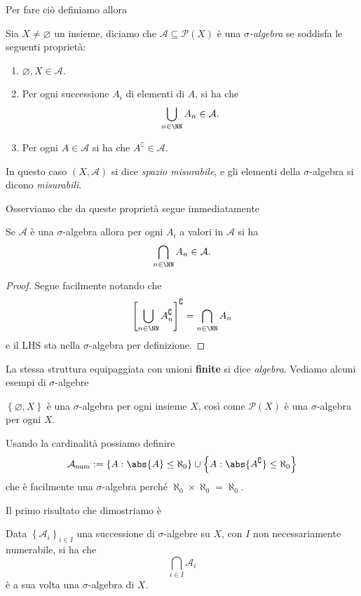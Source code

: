 \documentclass[11pt]{scrartcl}
\newcommand{\eset}{\varnothing}
\newcommand{\parti}[1]{\mathcal{P}\!\left(#1\right)}
\begin{document}
	Per fare ciò definiamo allora
	\begin{definition}
		Sia $X\ne \eset$ un insieme, diciamo che $\mathcal{A}\subseteq \parti{X}$ è una \textit{$\sigma$-algebra} se soddisfa le seguenti proprietà:
		\begin{enumerate}
			\item $\eset,X\in \mathcal{A}$.
			\item Per ogni successione $A_i$ di elementi di $A$, si ha che
			$$\bigcup_{n\in\NN}A_n\in \mathcal{A}.$$
			\item Per ogni $A\in \mathcal{A}$ si ha che $A^\complement\in \mathcal{A}$.
		\end{enumerate}
		In questo caso $(X,\mathcal{A})$ si dice \textit{spazio misurabile}, e gli elementi della $\sigma$-algebra si dicono \textit{misurabili}.
	\end{definition}
	Osserviamo che da queste proprietà segue immediatamente
	\begin{proposition}
		Se $\mathcal{A}$ è una $\sigma$-algebra allora per ogni $A_i$ a valori in $\mathcal{A}$ si ha
		$$\bigcap_{n\in\NN}A_n\in \mathcal{A}.$$
	\end{proposition}
	\begin{proof}
		Segue facilmente notando che
		$$\left[\bigcup_{n\in\NN}A_n^\complement\right]^\complement=\bigcap_{n\in\NN}A_n$$
		e il LHS sta nella $\sigma$-algebra per definizione.
	\end{proof}
	La stessa struttura equipaggiata con unioni \textbf{finite} si dice \textit{algebra}. Vediamo alcuni esempi di $\sigma$-algebre
	\begin{example}
		$\left\{\eset,X\right\}$ è una $\sigma$-algebra per ogni insieme $X$, così come $\parti{X}$ è una $\sigma$-algebra per ogni $X$.
	\end{example}
	\begin{example}[Numerabili]
		Usando la cardinalità possiamo definire
		$$\mathcal{A}_{\text{num}}:=\left\{A:\abs{A}\le \aleph_0\right\}\cup \left\{A:\abs{A^\complement}\le \aleph_0\right\}$$
		che è facilmente una $\sigma$-algebra perché $\aleph_0\times \aleph_0=\aleph_0$.
	\end{example}
	Il primo risultato che dimostriamo è
	\begin{lemma}
		Data $\left\{\mathcal{A}_i\right\}_{i\in I}$ una successione di $\sigma$-algebre su $X$, con $I$ non necessariamente numerabile, si ha che
		$$\bigcap_{i\in I}\mathcal{A}_i$$
		è a sua volta una $\sigma$-algebra di $X$.
	\end{lemma}
\end{document}
